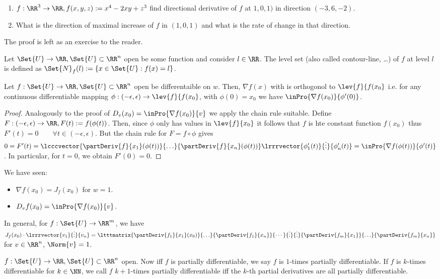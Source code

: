\begin{exam}
  \begin{enumerate}
  	\item $f:\RR^3\to\RR, f(x,y,z):=x^4-2xy+z^3$ find directional derivative of $f$ at $1,0,1)$ in direction $(-3,6,-2)$. 
  	\item What is the direction of maximal increase of $f$ in $(1,0,1)$ and what is the rate of change in that direction. 
  \end{enumerate}
  The proof is left as an exercise to the reader. 
\end{exam}
\begin{defn}
  Let $\Set{U}\to\RR, \Set{U}\subset\RR^n$ open be some function and consider $l\in\RR$. The level set (also called contour-line, \ldots) of $f$ at level $l$ is defined as $\Set{N}_f(l):=\{x\in\Set{U}:f(x)=l\}$. 
\end{defn}
\begin{prop}
  Let $f:\Set{U}\to\RR, \Set{U}\subset\RR^n$ open be differentaible on $w$. Then, $\nabla f(x)$ with  is orthogonol to $\lev{f}{f(x_0}$ i.e. for any continuous differentiable mapping $\phi:(-\epsilon,\epsilon)\to\lev{f}{f(x_0}$, with $\phi(0)=x_0$ we have $\inPro{\nabla f(x_0)}{\phi'(0)}$.
\end{prop}
\begin{proof}
  Analogously to the proof of $D_v(x_0)=\inPro{\nabla f(x_0)}{v}$ we apply the chain rule suitable. Define $F:(-\epsilon, \epsilon)\to\RR, F(t):=f(\phi(t))$. Then, since $\phi$ only has values in $\lev{f}{x_0}$ it follows that $f$ is hte constant function $f(x_0)$ thus $F'(t)=0\qquad\forall t\in(-\epsilon,\epsilon)$. But the chain rule for $F=f\circ \phi$ gives $0=F'(t)=\lcccvector{\partDeriv{f}{x_1}(\phi(t))}{\ldots}{\partDeriv{f}{x_n}(\phi(t))}\lrrrvector{\phi_1'(t)}{\vdots}{\phi_n'(t)}=\inPro{\nabla f(\phi(t))}{\phi'(t)}$. In particular, for $t=0$, we obtain $F'(0)=0$. 
\end{proof}
\begin{rem}
  We have seen: \begin{itemize}
  	\item $\nabla f(x_0)=J_f(x_0)$ for $w=1$. 
  	\item $D_vf(x_0)=\inPro{\nabla f(x_0)}{v}$.
  \end{itemize}
  In general, for $f:\Set{U}\to\RR^m$, we have $J_f(x_0)\cdot \lrrrvector{v_1}{\vdots}{v_n}=\ltttmatrix{\partDeriv{f_1}{x_1}(x_0)}{\ldots}{\partDeriv{f_1}{x_n}}{\cdots}{\vdots}{\vdots}{\partDeriv{f_m}{x_1}}{\ldots}{\partDeriv{f_m}{x_n}}$ for $v\in\RR^n$, $\Norm{v}=1$. 
\end{rem}
\begin{defn}
  $f:\Set{U}\to\RR, \Set{U}\subset\RR^n$ open. 
  Now iff $f$ is partially differentiable, we say $f$ is $1$-times partially differentiable. If $f$ is $k$-times differentiable for $k\in\NN$, we call $f$ $k+1$-times partially differentiable iff the $k$-th partial derivatives are all partially differentiable. 
\end{defn}
